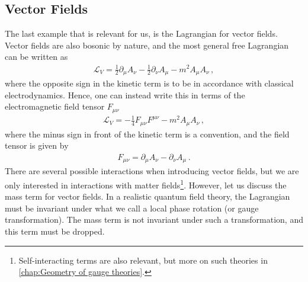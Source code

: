 \subsection*{Vector Fields}
The last example that is relevant for us, is the Lagrangian for vector fields. Vector fields are also bosonic by nature, and the most general free Lagrangian can be written as
\begin{align}
    \mathcal{L}_{V}=\frac{1}{2}\partial_{\mu}A_{\nu}-\frac{1}{2}\partial_{\nu}A_{\mu}-m^{2}A_{\mu}A_{\nu}\,,
\end{align}
where the opposite sign in the kinetic term is to be in accordance with classical electrodynamics. Hence, one can instead write this in terms of the electromagnetic field tensor $F_{\mu\nu}$
\begin{align}\label{eq:vector field LAgrangian}
    \mathcal{L}_{V}=-\frac{1}{4}F_{\mu\nu}F^{\mu\nu}-m^{2}A_{\mu}A_{\nu}\,,
\end{align}
where the minus sign in front of the kinetic term is a convention, and the field tensor is given by
\begin{align}
    F_{\mu\nu}=\partial_{\mu}A_{\nu}-\partial_{\nu}A_{\mu}\,.
\end{align}
There are several possible interactions when introducing vector fields, but we are only interested in interactions with matter fields\footnote{Self-interacting terms are also relevant, but more on such theories in \cref{chap:Geometry of gauge theories}.}. However, let us discuss the mass term for vector fields. In a realistic quantum field theory, the Lagrangian must be invariant under what we call a local phase rotation (or gauge transformation). The mass term is not invariant under such a transformation, and this term must be dropped. 

